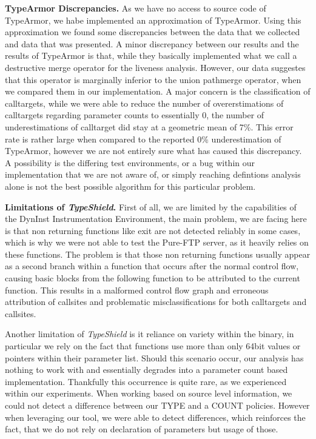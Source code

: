 \textbf{TypeArmor Discrepancies.}
\label{section:discrep}
As we have no access to source code of TypeArmor, we habe implemented an approximation
of TypeArmor. Using this approximation we found some discrepancies between the data that we collected
and data that was presented.
A minor discrepancy between our results and the results of TypeArmor is that, while they basically implemented
what we call a destructive merge operator for the liveness analysis. However, our data suggestes that this
operator is marginally inferior to the union pathmerge operator, when we compared them in our implementation.
A major concern is the classification of calltargets, while we were able to reduce the number of overerstimations
of calltargets regarding parameter counts to essentially 0, the number of underestimations of calltarget did
stay at a geometric mean of 7\%. This error rate is rather large when compared to the reported 0\% underestimation
of TypeArmor, however we are not entirely sure what has caused this discrepancy. A possibility is the differing
test environments, or a bug within our implementation that we are not aware of, or simply reaching defintions
analysis alone is not the best possible algorithm for this particular problem.

\textbf{Limitations of \textit{TypeShield}.}
\label{section:limit}
First of all, we are limited by the capabilities of the DynInst Instrumentation Environment, the main problem,
we are facing here is that non returning functions like exit are not detected reliably in some cases, which is
why we were not able to test the Pure-FTP server, as it heavily relies on these functions. The problem is that
those non returning functions usually appear as a second branch within a function that occurs after the normal
control flow, causing basic blocks from the following function to be attributed to the current function. This
results in a malformed control flow graph and erroneous attribution of callsites and problematic misclassifications
for both calltargets and callsites.

Another limitation of \textit{TypeShield} is it reliance on variety within the binary, in particular we rely on
the fact that functions use more than only 64bit values or pointers within their parameter list. Should this
scenario occur, our analysis has nothing to work with and essentially degrades into a parameter count based
implementation. Thankfully this occurrence is quite rare, as we experienced within our experiments. When working
based on source level information, we could not detect a difference between our TYPE and a COUNT policies. 
However when leveraging our tool, we were able to detect differences, which reinforces the fact, that we do 
not rely on declaration of parameters but usage of those.

